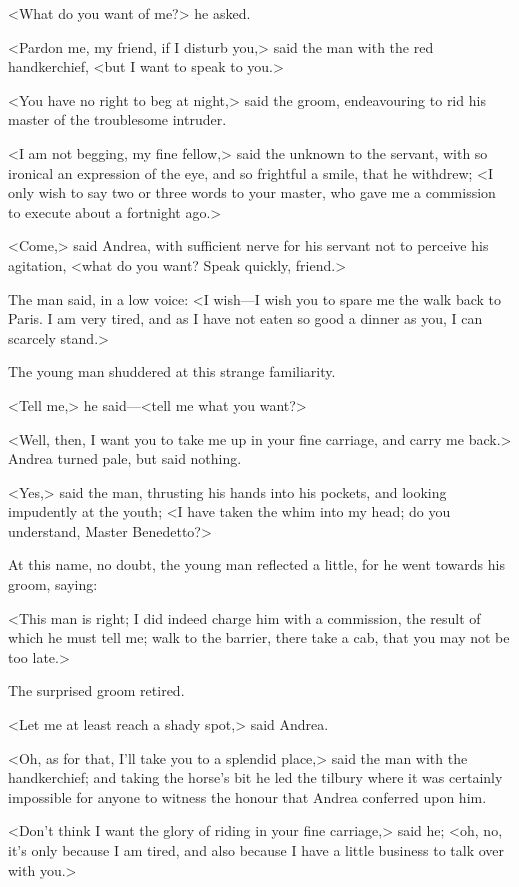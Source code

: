  <What do you want of me?> he asked. 

 <Pardon me, my friend, if I disturb you,> said the man with the red handkerchief, <but I want to speak to you.> 

 <You have no right to beg at night,> said the groom, endeavouring to rid his master of the troublesome intruder. 

 <I am not begging, my fine fellow,> said the unknown to the servant, with so ironical an expression of the eye, and so frightful a smile, that he withdrew; <I only wish to say two or three words to your master, who gave me a commission to execute about a fortnight ago.> 

 <Come,> said Andrea, with sufficient nerve for his servant not to perceive his agitation, <what do you want? Speak quickly, friend.> 

 The man said, in a low voice: <I wish—I wish you to spare me the walk back to Paris. I am very tired, and as I have not eaten so good a dinner as you, I can scarcely stand.> 

 The young man shuddered at this strange familiarity. 

 <Tell me,> he said—<tell me what you want?> 

 <Well, then, I want you to take me up in your fine carriage, and carry me back.> Andrea turned pale, but said nothing. 

 <Yes,> said the man, thrusting his hands into his pockets, and looking impudently at the youth; <I have taken the whim into my head; do you understand, Master Benedetto?> 

 At this name, no doubt, the young man reflected a little, for he went towards his groom, saying: 

 <This man is right; I did indeed charge him with a commission, the result of which he must tell me; walk to the barrier, there take a cab, that you may not be too late.> 

 The surprised groom retired. 

 <Let me at least reach a shady spot,> said Andrea. 

 <Oh, as for that, I'll take you to a splendid place,> said the man with the handkerchief; and taking the horse's bit he led the tilbury where it was certainly impossible for anyone to witness the honour that Andrea conferred upon him. 

 <Don't think I want the glory of riding in your fine carriage,> said he; <oh, no, it's only because I am tired, and also because I have a little business to talk over with you.> 

